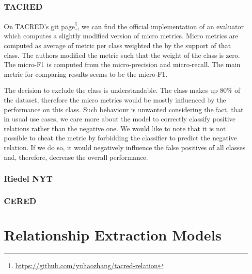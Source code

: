 \subsubsection{TACRED}
On TACRED's git page\footnote{\url{https://github.com/yuhaozhang/tacred-relation}}, we can find the official implementation of an evaluator which computes a slightly modified version of micro metrics. Micro metrics are computed as average of metric per class weighted the by the support of that class. The authors modified the metric such that the weight of the  class is zero. The micro-F1 is computed from the micro-precision and micro-recall. The main metric for comparing results seems to be the micro-F1.

The decision to exclude the  class is understandable. The class makes up 80\% of the dataset, therefore the micro metrics would be mostly influenced by the performance on this class. Such behaviour is unwanted considering the fact, that in usual use cases, we care more about the model to correctly classify  positive relations rather than the negative one. We would like to note that it is not possible to cheat the metric by forbidding the classifier to predict the negative relation. If we do so, it would negatively influence the false positives of all classes and, therefore, decrease the overall performance.


\subsubsection{Riedel NYT}


\subsubsection{CERED}







\section{Relationship Extraction Models}


